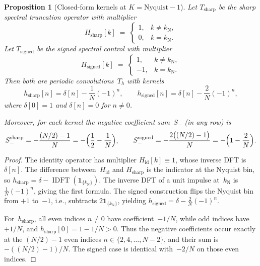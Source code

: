 \documentclass[11pt,a4paper]{article}
\theoremstyle{plain}
\newtheorem{proposition}[theorem]{Proposition}
\theoremstyle{definition}
\theoremstyle{plain}
\newcommand{\Sminus}{S_{-}}
\DeclareMathOperator{\IDFT}{IDFT}
\begin{document}
\begin{proposition}[Closed-form kernels at $K = \mathrm{Nyquist}-1$]
\label{prop:closed-form}
Let $T_{\mathrm{sharp}}$ be the sharp spectral truncation operator with
multiplier
\[
  H_{\mathrm{sharp}}[k] \;=\;
  \begin{cases}
    1, & k \neq k_{\mathrm{N}},\\
    0, & k = k_{\mathrm{N}}.
  \end{cases}
\]
Let $T_{\mathrm{signed}}$ be the signed spectral control with multiplier
\[
  H_{\mathrm{signed}}[k] \;=\;
  \begin{cases}
    1, & k \neq k_{\mathrm{N}},\\
    -1, & k = k_{\mathrm{N}}.
  \end{cases}
\]
Then both are periodic convolutions~$T_h$ with kernels
\[
  h_{\mathrm{sharp}}[n] = \delta[n] - \frac{1}{N}(-1)^n,
  \qquad
  h_{\mathrm{signed}}[n] = \delta[n] - \frac{2}{N}(-1)^n,
\]
where $\delta[0] = 1$ and $\delta[n] = 0$ for $n \neq 0$.

Moreover, for each kernel the negative coefficient sum~$\Sminus$ (in any row) is
\[
  \Sminus^{\mathrm{sharp}}
  = -\frac{(N/2)-1}{N}
  = -\Bigl(\frac{1}{2} - \frac{1}{N}\Bigr),
  \qquad
  \Sminus^{\mathrm{signed}}
  = -\frac{2\bigl((N/2)-1\bigr)}{N}
  = -\Bigl(1 - \frac{2}{N}\Bigr).
\]
\end{proposition}

\begin{proof}
The identity operator has multiplier $H_{\mathrm{id}}[k] \equiv 1$, whose
inverse DFT is~$\delta[n]$.  The difference between~$H_{\mathrm{id}}$ and
$H_{\mathrm{sharp}}$ is the indicator at the Nyquist bin, so
$h_{\mathrm{sharp}} = \delta - \IDFT(\mathbf{1}_{\{k_{\mathrm{N}}\}})$.  The
inverse DFT of a unit impulse at~$k_{\mathrm{N}}$ is $\frac{1}{N}(-1)^n$,
giving the first formula.  The signed construction flips the Nyquist bin from
$+1$ to~$-1$, i.e., subtracts $2\mathbf{1}_{\{k_{\mathrm{N}}\}}$, yielding
$h_{\mathrm{signed}} = \delta - \frac{2}{N}(-1)^n$.

For~$h_{\mathrm{sharp}}$, all even indices $n \neq 0$ have coefficient~$-1/N$,
while odd indices have~$+1/N$, and $h_{\mathrm{sharp}}[0] = 1 - 1/N > 0$.
Thus the negative coefficients occur exactly at the $(N/2)-1$ even indices
$n \in \{2,4,\dots,N-2\}$, and their sum is $-((N/2)-1)/N$.  The signed case is
identical with~$-2/N$ on those even indices.
\end{proof}
\end{document}
